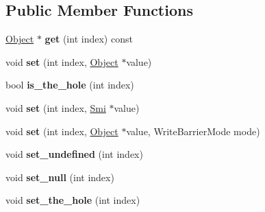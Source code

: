\subsection*{Public Member Functions}
\begin{DoxyCompactItemize}
\item 
\hyperlink{classv8_1_1internal_1_1_object}{Object} $\ast$ {\bfseries get} (int index) const \hypertarget{classv8_1_1internal_1_1_fixed_array_a377d38cb8235446c97cedaf0a0ac28c4}{}\label{classv8_1_1internal_1_1_fixed_array_a377d38cb8235446c97cedaf0a0ac28c4}

\item 
void {\bfseries set} (int index, \hyperlink{classv8_1_1internal_1_1_object}{Object} $\ast$value)\hypertarget{classv8_1_1internal_1_1_fixed_array_aafab6314d4f31024b9251909d1d88291}{}\label{classv8_1_1internal_1_1_fixed_array_aafab6314d4f31024b9251909d1d88291}

\item 
bool {\bfseries is\+\_\+the\+\_\+hole} (int index)\hypertarget{classv8_1_1internal_1_1_fixed_array_a7fe86da7c98e5930aa00d0df1b71feff}{}\label{classv8_1_1internal_1_1_fixed_array_a7fe86da7c98e5930aa00d0df1b71feff}

\item 
void {\bfseries set} (int index, \hyperlink{classv8_1_1internal_1_1_smi}{Smi} $\ast$value)\hypertarget{classv8_1_1internal_1_1_fixed_array_a0138e25841551aff834de2d631a91bfc}{}\label{classv8_1_1internal_1_1_fixed_array_a0138e25841551aff834de2d631a91bfc}

\item 
void {\bfseries set} (int index, \hyperlink{classv8_1_1internal_1_1_object}{Object} $\ast$value, Write\+Barrier\+Mode mode)\hypertarget{classv8_1_1internal_1_1_fixed_array_a4fbeb8596dd1226bd16018707e3989b4}{}\label{classv8_1_1internal_1_1_fixed_array_a4fbeb8596dd1226bd16018707e3989b4}

\item 
void {\bfseries set\+\_\+undefined} (int index)\hypertarget{classv8_1_1internal_1_1_fixed_array_ace6f77f62936b9d34d3e6ea66d2a0c28}{}\label{classv8_1_1internal_1_1_fixed_array_ace6f77f62936b9d34d3e6ea66d2a0c28}

\item 
void {\bfseries set\+\_\+null} (int index)\hypertarget{classv8_1_1internal_1_1_fixed_array_a22a91c71f2f6ccbe56a7bf2aad86c64d}{}\label{classv8_1_1internal_1_1_fixed_array_a22a91c71f2f6ccbe56a7bf2aad86c64d}

\item 
void {\bfseries set\+\_\+the\+\_\+hole} (int index)\hypertarget{classv8_1_1internal_1_1_fixed_array_af5387df4a82963ca41ebc6bb6890368a}{}\label{classv8_1_1internal_1_1_fixed_array_af5387df4a82963ca41ebc6bb6890368a}


\end{DoxyCompactItemize}
